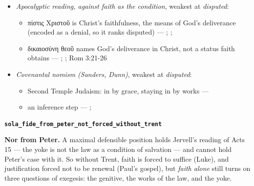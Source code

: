 \documentclass[11pt]{article}
\begin{document}
\begin{itemize}
\begin{itemize}
\item λογίζομαι in Romans 4:3–11 is the language of reckoning: credited to one's account --- \cite[s.v. λογίζομαι]{bauer-danker-lexicon-2000}; \cite[ad loc. Rom 4:3]{moo-romans-1996}
\item A word contributes the least meaning its context requires; one occurrence does not carry the whole concept --- \cite{silva-biblical-words-1994}; \cite{joos-semantic-axiom-1972}; \cite{barr-semantics-2004}
\item an inference step --- \cite[ad loc. Rom 4:6]{moo-romans-1996}; \cite[s.v. λογίζομαι]{bauer-danker-lexicon-2000}
\item an inference step --- \cite{silva-biblical-words-1994}; \cite[p. 80]{moo-romans-1996}; \cite{barr-semantics-2004}
\end{itemize}
\item \emph{Apocalyptic reading, against faith as the condition}, weakest at \emph{disputed}:
\begin{itemize}
\item πίστις Χριστοῦ is Christ's faithfulness, the means of God's deliverance (encoded as a denial, so it ranks disputed) --- \cite{campbell-deliverance-god-2009}; \cite[ad loc. Gal 2:16]{martyn-galatians-1997}; \cite{hays-faith-jesus-christ-2002}
\item δικαιοσύνη θεοῦ names God's deliverance in Christ, not a status faith obtains --- \cite{campbell-deliverance-god-2009}; \cite{martyn-galatians-1997}; Rom 3:21-26
\end{itemize}
\item \emph{Covenantal nomism (Sanders, Dunn)}, weakest at \emph{disputed}:
\begin{itemize}
\item Second Temple Judaism: in by grace, staying in by works --- \cite{sanders-paul-palestinian-judaism-1977}
\item an inference step --- \cite{dunn-new-perspective-2005}; \cite{wright-what-paul-said-1997}
\end{itemize}
\end{itemize}
\par\medskip\noindent\textbf{\texttt{sola\_\allowbreak{}fide\_\allowbreak{}from\_\allowbreak{}peter\_\allowbreak{}not\_\allowbreak{}forced\_\allowbreak{}without\_\allowbreak{}trent}}\par\nobreak\noindent
\textbf{Nor from Peter.} A maximal defensible position holds Jervell's reading of Acts 15 — the yoke is not the law as a condition of salvation — and cannot hold Peter's case with it. So without Trent, faith is forced to suffice (Luke), and justification forced not to be renewal (Paul's gospel), but \emph{faith alone} still turns on three questions of exegesis: the genitive, the works of the law, and the yoke.
\end{document}
